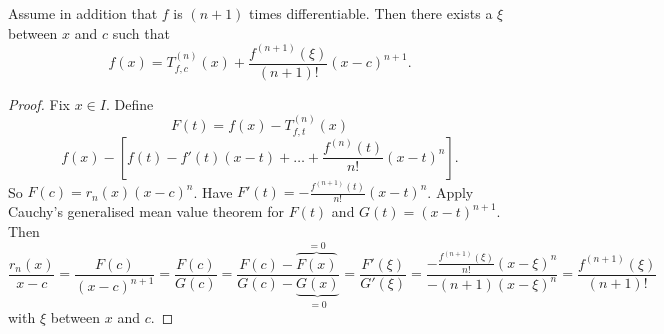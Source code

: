 \begin{theorem}\label{thm:taylor_lagrange}
    Assume in addition that $f$ is $(n + 1)$ times differentiable.
    Then there exists a $\xi$ between $x$ and $c$ such that
    \[
    f(x) = T_{f, c} ^ {(n)}(x) + \frac{f ^ {(n + 1)}(\xi)}{(n + 1)!}(x - c) ^ {n + 1}.
    \]
\end{theorem}
\begin{proof}
    Fix $x \in I$.
    Define
    \[
    F(t) = f(x) - T_{f, t} ^ {(n)}(x)
    \]
    \[
    f(x) - \left[f(t) - f'(t)(x - t) + \dotsc + \frac{f ^ {(n)}(t)}{n!}(x - t) ^ n\right].
    \]
    So $F(c) = r_n(x)(x - c) ^ n$.
    Have $F'(t) = -\frac{f ^ {(n + 1)}(t)}{n!}(x - t) ^ n$.
    Apply Cauchy's generalised mean value theorem for $F(t)$ and $G(t) = (x - t) ^ {n + 1}$.
    Then
    \[
    \frac{r_n(x)}{x - c} = \frac{F(c)}{(x - c) ^ {n + 1}} = \frac{F(c)}{G(c)} = \frac{F(c) - \overbrace{F(x)}^{= 0}}{G(c) - \underbrace{G(x)}_{= 0}} = \frac{F'(\xi)}{G'(\xi)} = \frac{{-\frac{f ^ {(n + 1)}(\xi)}{n!}(x - \xi) ^ n}}{-(n + 1)(x - \xi) ^ n} = \frac{f ^ {(n + 1)}(\xi)}{(n + 1)!}
    \]
    with $\xi$ between $x$ and $c$.
\end{proof}
















